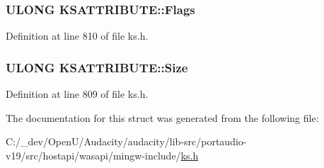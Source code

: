 \subsubsection[{\texorpdfstring{Flags}{Flags}}]{\setlength{\rightskip}{0pt plus 5cm}U\+L\+O\+NG K\+S\+A\+T\+T\+R\+I\+B\+U\+T\+E\+::\+Flags}\hypertarget{struct_k_s_a_t_t_r_i_b_u_t_e_a3db8e84ca1fa7ce31f2281dd0650d6f2}{}\label{struct_k_s_a_t_t_r_i_b_u_t_e_a3db8e84ca1fa7ce31f2281dd0650d6f2}


Definition at line 810 of file ks.\+h.

\subsubsection[{\texorpdfstring{Size}{Size}}]{\setlength{\rightskip}{0pt plus 5cm}U\+L\+O\+NG K\+S\+A\+T\+T\+R\+I\+B\+U\+T\+E\+::\+Size}\hypertarget{struct_k_s_a_t_t_r_i_b_u_t_e_a5ad1665b8d8b08a7ad8bc621e44d3460}{}\label{struct_k_s_a_t_t_r_i_b_u_t_e_a5ad1665b8d8b08a7ad8bc621e44d3460}


Definition at line 809 of file ks.\+h.



The documentation for this struct was generated from the following file\+:\begin{DoxyCompactItemize}
\item 
C\+:/\+\_\+dev/\+Open\+U/\+Audacity/audacity/lib-\/src/portaudio-\/v19/src/hostapi/wasapi/mingw-\/include/\hyperlink{ks_8h}{ks.\+h}\end{DoxyCompactItemize}
